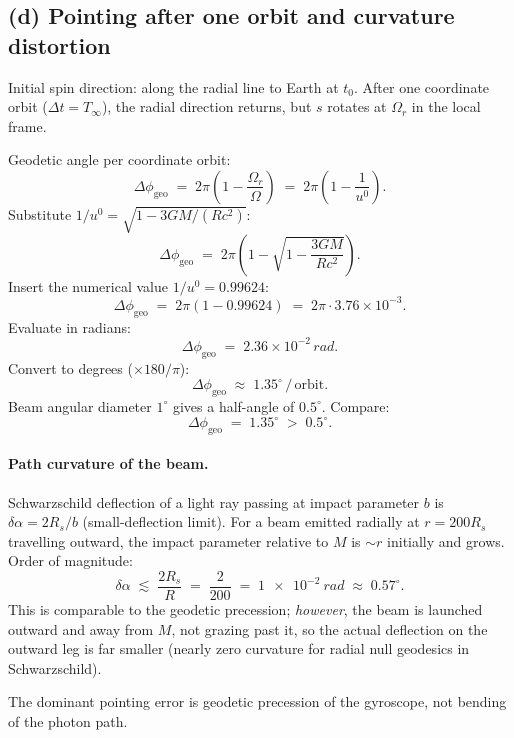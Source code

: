 \documentclass[11pt]{article}
\begin{document}
\subsection*{(d) Pointing after one orbit and curvature distortion}

Initial spin direction: along the radial line to Earth at $t_0$. After one coordinate orbit ($\Delta t=T_\infty$), the radial direction returns, but $s$ rotates at $\Omega_r$ in the local frame.

Geodetic angle per coordinate orbit:
\[
\Delta\phi_{\text{geo}} \;=\; 2\pi\!\left(1-\frac{\Omega_r}{\Omega}\right) \;=\; 2\pi\!\left(1-\frac{1}{u^0}\right).
\]
Substitute $1/u^0=\sqrt{1-3GM/(Rc^2)}$:
\[
\Delta\phi_{\text{geo}} \;=\; 2\pi\!\left(1-\sqrt{1-\frac{3GM}{Rc^2}}\right).
\]
Insert the numerical value $1/u^0=0.99624$:
\[
\Delta\phi_{\text{geo}} \;=\; 2\pi(1-0.99624) \;=\; 2\pi\cdot 3.76\times 10^{-3}.
\]
Evaluate in radians:
\[
\Delta\phi_{\text{geo}} \;=\; 2.36\times 10^{-2}\,\si{rad}.
\]
Convert to degrees ($\times 180/\pi$):
\begin{equation}
\boxed{\;\Delta\phi_{\text{geo}}\;\approx\;1.35^\circ\,/\,\text{orbit}.\;}
\label{eq:dphigeo}
\end{equation}
Beam angular diameter $1^\circ$ gives a half-angle of $0.5^\circ$. Compare:
\[
\Delta\phi_{\text{geo}} \;=\; 1.35^\circ \;>\; 0.5^\circ.
\]

\paragraph{Path curvature of the beam.}
Schwarzschild deflection of a light ray passing at impact parameter $b$ is $\delta\alpha=2 R_s/b$ (small-deflection limit). For a beam emitted radially at $r=200 R_s$ travelling outward, the impact parameter relative to $M$ is $\sim r$ initially and grows. Order of magnitude:
\[
\delta\alpha \;\lesssim\; \frac{2 R_s}{R} \;=\; \frac{2}{200} \;=\; \SI{1e-2}{rad} \;\approx\; 0.57^\circ.
\]
This is comparable to the geodetic precession; \emph{however}, the beam is launched outward and away from $M$, not grazing past it, so the actual deflection on the outward leg is far smaller (nearly zero curvature for radial null geodesics in Schwarzschild). 

The dominant pointing error is geodetic precession of the gyroscope, not bending of the photon path.
\end{document}
